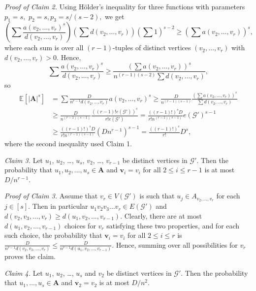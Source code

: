 \documentclass[a4paper,11pt]{article}
\makeatletter
\renewenvironment{proof}[1][\proofname] {\par\pushQED{\qed}\normalfont\topsep6\p@\@plus6\p@\relax\trivlist\item[\hskip\labelsep\bfseries#1\@addpunct{.}]\ignorespaces}{\popQED\endtrivlist\@endpefalse}
\theoremstyle{definition}
\def\vv{\textbf{v}}
\def\vA{\textbf{A}}
\def\cG{\mathcal{G}}
\makeatother
\begin{document}
\begin{proof}[Proof of Theorem \ref{thm:dependent random choice}]
\medskip

\noindent \emph{Proof of Claim 2.} Using H\"older's inequality for three functions with parameters $p_1 = s,$ $p_2 = s, p_3 = s / (s-2),$ we get
$$\left(\sum \frac{a(v_2,\dots,v_r)^s}{d(v_2,\dots,v_r)}\right)\left(\sum d(v_2,\dots,v_r)\right)\left(\sum 1 \right)^{s-2}\geq \left(\sum a(v_2,\dots,v_r)\right)^s,$$
where each sum is over all $(r-1)$-tuples of distinct vertices $(v_2,\dots,v_r)$ with $d(v_2,\dots,v_r)>0$. 
Hence,
$$\sum \frac{a(v_2,\dots,v_r)^s}{d(v_2,\dots,v_r)}\geq \frac{\left(\sum a(v_2,\dots,v_r)\right)^s}{n^{(r-1)(s-2)}\sum d(v_2,\dots,v_r)},$$
so
\begin{align*}
    \mathbb{E}[|\vA|^s]
    &=\sum \frac{D}{n^{r-1} d(v_2,\dots,v_r)}a(v_2,\dots,v_r)^s\geq \frac{D}{n^{(r-1)(s-1)}} \frac{(\sum a(v_2,\dots,v_r))^s}{\sum d(v_2,\dots,v_r)} \\ &\geq \frac{D}{n^{(r-1)(s-1)}}\frac{((r-1)!e(\cG'))^s}{r!e(\cG')}= \frac{((r-1)!)^s D}{r! n^{(r-1)(s-1)}}e(\cG')^{s-1} \\
    &\geq \frac{((r-1)!)^s D}{r! n^{(r-1)(s-1)}}(Dn^{r-1})^{s-1}=\frac{((r-1)!)^s}{r!}D^s,
\end{align*}
where the second inequality used Claim 1.

\medskip

\noindent \emph{Claim 3.} Let $u_1$, $u_2$, \dots, $u_s$, $v_2$, \dots, $v_{r-1}$ be distinct vertices in $\cG'$. Then the probability that $u_1,u_2,\dots,u_s\in \vA$ and $\vv_i=v_i$ for all $2\leq i\leq r-1$ is at most $D/n^{r-1}$.

\medskip

\noindent \emph{Proof of Claim 3.} Assume that $v_r\in V(\cG')$ is such that $u_j\in A_{v_2,\dots,v_r}$ for each $j\in [s]$. Then in particular $u_1v_2v_3\dots v_r\in E(\cG')$ and $d(v_2,v_3,\dots,v_r)\geq d(u_1,v_2,\dots,v_{r-1})$. Clearly, there are at most $d(u_1,v_2,\dots,v_{r-1})$ choices for $v_r$ satisfying these two properties, and for each such choice, the probability that $\vv_i=v_i$ for all $2\leq i\leq r$ is $\frac{D}{n^{r-1} d(v_2,v_3,\dots,v_r)}\leq \frac{D}{n^{r-1} d(u_1,v_2,\dots,v_{r-1})}$. Hence, summing over all possibilities for $v_r$ proves the claim.

\medskip

\noindent \emph{Claim 4.} Let $u_1$, $u_2$, \dots, $u_s$ and $v_2$ be distinct vertices in $\cG'$. Then the probability that $u_1,\dots,u_s\in \vA$ and $\vv_2=v_2$ is at most $D/n^2$.

\medskip


\end{proof}
\end{document}
